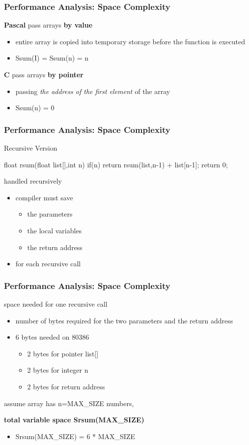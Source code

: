 \documentclass[newPxFont,sthlmFooter,nooffset]{beamer}
\begin{document}
\begin{frame}[t]
  \frametitle{Performance Analysis: Space Complexity}
\textbf{Pascal} pass arrays \textbf{by value}
\begin{itemize}
\item entire array is copied into temporary storage before the
  function is executed
\item Ssum(I) = Ssum(n) = n
\end{itemize}

\textbf{C} pass arrays \textbf{by pointer}
\begin{itemize}
\item passing \textit{the address of the first element} of the array
\item Ssum(n) = 0
\end{itemize}

\end{frame}

\begin{frame}[t, fragile]
  \frametitle{Performance Analysis: Space Complexity}
Recursive Version
\begin{codedef}
float rsum(float list[],int n) {
   if(n) return rsum(list,n-1) + list[n-1]; 
   return 0;
}
\end{codedef}
handled recursively
\begin{itemize}
\item compiler must save
  \begin{itemize}
  \item the parameters
  \item the local variables
  \item the return address
  \end{itemize}
\item for each recursive call
\end{itemize}

\end{frame}

\begin{frame}[t]
  \frametitle{Performance Analysis: Space Complexity}
space needed for one recursive call
\begin{itemize}
\item number of bytes required for the two parameters and the return
  address
\item 6 bytes needed on 80386
  \begin{itemize}
  \item 2 bytes for pointer list[]
  \item 2 bytes for integer n
  \item 2 bytes for return address
  \end{itemize}

\end{itemize}

\textsf{assume} array has n=MAX\_SIZE numbers, 

\textbf{total variable space Srsum(MAX\_SIZE)}
\begin{itemize}
\item Srsum(MAX\_SIZE) = 6 * MAX\_SIZE
\end{itemize}

\end{frame}
\end{document}
